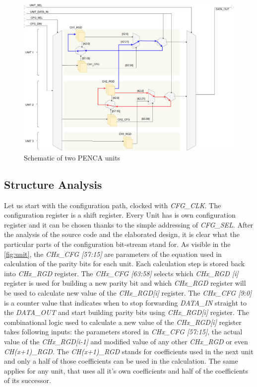 \begin{figure}[h]
\centering
\includegraphics[width=\textwidth]{figures/Unit_arch.png}
\caption{Schematic of two PENCA units}
\label{fig:unit}
\end{figure}

\subsection{Structure Analysis}
Let us start with the configuration path, clocked with \textit{CFG\_CLK}. The configuration register is a shift register. Every Unit has is own configuration register and it can be chosen thanks to the simple addressing of \textit{CFG\_SEL}. After the analysis of the source code and the elaborated design, it is clear what the particular parts of the configuration bit-stream stand for. As visible in the \autoref{fig:unit}, the \textit{CHx\_CFG [57:15]} are parameters of the equation used in calculation of the parity bits for each unit. Each calculation step is stored back into \textit{CHx\_RGD} register. The \textit{CHx\_CFG [63:58]} selects which \textit{CHx\_RGD [i]} register is used for building a new parity bit and which \textit{CHx\_RGD} register will be used to calculate new value of the \textit{CHx\_RGD[i]} register. The \textit{CHx\_CFG [9:0]} is a counter value that indicates when to stop forwarding \textit{DATA\_IN} straight to the \textit{DATA\_OUT} and start building parity bits using \textit{CHx\_RGD[i]} register. The combinational logic used to calculate a new value of the \textit{CHx\_RGD[i]} register takes following inputs: the parameters stored in \textit{CHx\_CFG [57:15]}, the actual value of the \textit{CHx\_RGD[i-1]} and modified value of any other \textit{CHx\_RGD} or even \textit{CH(x+1)\_RGD}. The \textit{CH(x+1)\_RGD} stands for coefficients used in the next unit and only a half of those coefficients can be used in the calculation. The same applies for any unit, that uses all it's own coefficients and half of the coefficients of its successor.
